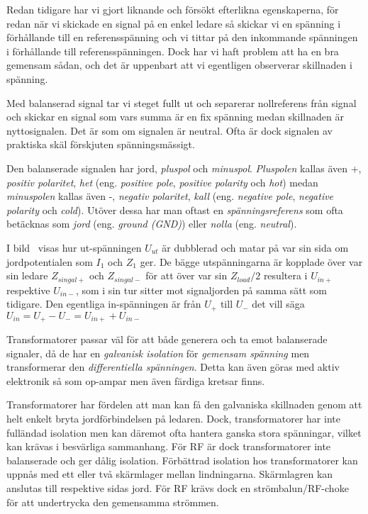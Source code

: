 Redan tidigare har vi gjort liknande och försökt efterlikna egenskaperna, för
redan när vi skickade en signal på en enkel ledare så skickar vi en spänning
i förhållande till en referensspänning och vi tittar på den inkommande
spänningen i förhållande till referensspänningen.
Dock har vi haft problem att ha en bra gemensam sådan, och det är uppenbart
att vi egentligen observerar skillnaden i spänning.

Med balanserad signal tar vi steget fullt ut och separerar nollreferens från
signal och skickar en signal som vars summa är en fix spänning medan
skillnaden är nyttosignalen.
Det är som om signalen är neutral.
Ofta är dock signalen av praktiska skäl förskjuten spänningsmässigt.

Den balanserade signalen har jord, \emph{pluspol} och \emph{minuspol}.
\emph{Pluspolen} kallas även +, \emph{positiv polaritet}, \emph{het} (eng.
\emph{positive pole}, \emph{positive polarity} och \emph{hot}) medan
\emph{minuspolen} kallas även -, \emph{negativ polaritet}, \emph{kall} (eng.
\emph{negative pole}, \emph{negative polarity} och \emph{cold}).
Utöver dessa har man oftast en \emph{spänningsreferens} som ofta betäcknas som
\emph{jord} (eng. \emph{ground (GND)}) eller \emph{nolla} (eng.
\emph{neutral}).

I bild~ visas hur ut-spänningen \(U_{ut}\) är dubblerad och
matar på var sin sida om jordpotentialen som  \(I_{1}\) och \(Z_{1}\) ger.
De bägge utspänningarna är kopplade över var sin ledare \(Z_{singal+}\) och
\(Z_{singal-}\) för att över var sin \(Z_{load}/2\) resultera i \(U_{in+}\)
respektive \(U_{in-}\), som i sin tur sitter mot signaljorden på samma sätt
som tidigare.
Den egentliga in-spänningen är från \(U_{+}\) till \(U_{-}\) det vill säga
\(U_{in} = U_{+} - U_{-} = U_{in+}+U_{in-}\)

Transformatorer passar väl för att både generera och ta emot balanserade
signaler, då de har en \emph{galvanisk isolation} för \emph{gemensam spänning}
men transformerar den \emph{differentiella spänningen}.
Detta kan även göras med aktiv elektronik så som op-ampar men även färdiga
kretsar finns.

Transformatorer har fördelen att man kan få den galvaniska skillnaden genom
att helt enkelt bryta jordförbindelsen på ledaren.
Dock, transformatorer har inte fulländad isolation men kan däremot ofta hantera
ganska stora spänningar, vilket kan krävas i besvärliga sammanhang.
För RF är dock transformatorer inte balanserade och ger dålig isolation.
Förbättrad isolation hos transformatorer kan uppnås med ett eller två
skärmlager mellan lindningarna.
Skärmlagren kan anslutas till respektive sidas jord.
För RF krävs dock en strömbalun/RF-choke för att undertrycka den
gemensamma strömmen.

